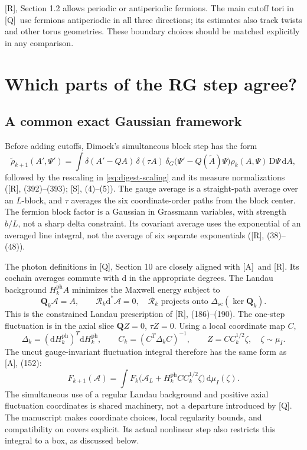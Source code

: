 \documentclass[11pt]{article}
\numberwithin{equation}{section}
\newcommand{\dd}{\mathrm d}
\newcommand{\Q}{\textup{[Q]}}
\newcommand{\AG}{\textup{[A]}}
\newcommand{\UR}{\textup{[R]}}
\newcommand{\US}{\textup{[S]}}
\begin{document}
\UR, Section 1.2 allows periodic or antiperiodic fermions. The main
cutoff tori in \Q\ use fermions antiperiodic in all three directions;
its estimates also track twists and other torus geometries. These
boundary choices should be matched explicitly in any comparison.

\section{Which parts of the RG step agree?}

\subsection{A common exact Gaussian framework}

Before adding cutoffs, Dimock's simultaneous block step has the form
\begin{equation}
 \widetilde\rho_{k+1}(A',\Psi')
 =\int\delta(A'-QA)\,\delta(\tau A)\,
       \delta_G\bigl(\Psi'-Q(\widetilde A)\Psi\bigr)
       \rho_k(A,\Psi)\,\mathrm D\Psi\,\dd A,
 \label{eq:digest-RG}
\end{equation}
followed by the rescaling in \eqref{eq:digest-scaling} and its measure
normalizations (\UR, (392)--(393); \US, (4)--(5)). The gauge average
is a straight-path average over an $L$-block, and $\tau$ averages the
six coordinate-order paths from the block center. The fermion block
factor is a Gaussian in Grassmann variables, with strength $b/L$,
not a sharp delta constraint. Its covariant average uses the
exponential of an averaged line integral, not the average of six
separate exponentials (\UR, (38)--(48)).

The photon definitions in \Q, Section 10 are closely aligned with
\AG\ and \UR. Its cochain averages commute with $\dd$ in the
appropriate degrees. The Landau background $H_k^{\mathrm{ph}}A$
minimizes the Maxwell energy subject to
\begin{equation}
 \mathbf Q_k\mathscr A=A,\qquad
 \mathcal R_k\dd^*\mathscr A=0,
 \quad \mathcal R_k\text{ projects onto }
           \Delta_{\mathrm{sc}}(\ker\mathbf Q_k).
\end{equation}
This is the constrained Landau prescription of \UR, (186)--(190).
The one-step fluctuation is in the axial slice
$\mathbf QZ=0$, $\tau Z=0$. Using a local coordinate map $C$,
\begin{equation}
 \Delta_k=(\dd H_k^{\mathrm{ph}})^T\dd H_k^{\mathrm{ph}},\qquad
 C_k=(C^T\Delta_k C)^{-1},\qquad
 Z=CC_k^{1/2}\zeta,\quad \zeta\sim\mu_I.
 \label{eq:digest-photon}
\end{equation}
The uncut gauge-invariant fluctuation integral therefore has the
same form as \AG, (152):
\begin{equation}
 F_{k+1}(\mathscr A)
 =\int F_k\bigl(\mathscr A_L+
                 H_k^{\mathrm{ph}}CC_k^{1/2}\zeta\bigr)\,\dd\mu_I(\zeta).
\end{equation}
The simultaneous use of a regular Landau background and positive
axial fluctuation coordinates is shared machinery, not a departure
introduced by \Q. The manuscript makes coordinate choices, local
regularity bounds, and compatibility on covers explicit. Its actual
nonlinear step also restricts this integral to a box, as discussed below.
\end{document}
